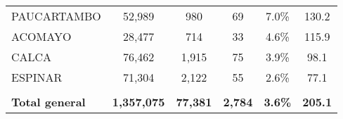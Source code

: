 \begin{tabular}{lccccc}
	\cellcolor[HTML]{FFE699}PAUCARTAMBO                             & 52,989               & 980                        & 69                   & 7.0\%                      & 130.2                                       \\
	\cellcolor[HTML]{FFE699}ACOMAYO                                 & 28,477               & 714                        & 33                   & 4.6\%                      & 115.9                                       \\
	\cellcolor[HTML]{FFE699}CALCA                                   & 76,462               & 1,915                      & 75                   & 3.9\%                      & 98.1                                        \\
	\cellcolor[HTML]{FFE699}ESPINAR                                 & 71,304               & 2,122                      & 55                   & 2.6\%                      & 77.1                                        \\
	& \multicolumn{1}{l}{} & \multicolumn{1}{l}{}       & \multicolumn{1}{l}{} & \multicolumn{1}{l}{}       & \multicolumn{1}{l}{}                        \\
	\rowcolor[HTML]{DDEBF7} 
	\textbf{Total general}                                          & \textbf{1,357,075}   & \textbf{77,381}            & \textbf{2,784}       & \textbf{3.6\%}             & \textbf{205.1}                             
\end{tabular}